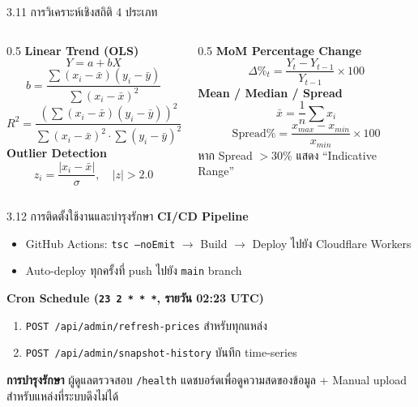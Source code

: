 \documentclass[aspectratio=169,11pt]{beamer}
\begin{document}
\begin{frame}{3.11 การวิเคราะห์เชิงสถิติ 4 ประเภท}
  \footnotesize
  \begin{columns}[T,onlytextwidth]
    \begin{column}{0.5\textwidth}
      \textbf{Linear Trend (OLS)}
      \[
        Y = a + bX
      \]
      \[
        b = \frac{\sum (x_i - \bar{x})(y_i - \bar{y})}{\sum (x_i - \bar{x})^2}
      \]
      \[
        R^2 = \frac{(\sum(x_i-\bar{x})(y_i-\bar{y}))^2}
                   {\sum(x_i-\bar{x})^2 \cdot \sum(y_i-\bar{y})^2}
      \]
      \vspace{0.3em}
      \textbf{Outlier Detection}
      \[
        z_i = \frac{|x_i - \bar{x}|}{\sigma}, \quad |z| > 2.0
      \]
    \end{column}
    \begin{column}{0.5\textwidth}
      \textbf{MoM Percentage Change}
      \[
        \Delta\%_t = \frac{Y_t - Y_{t-1}}{Y_{t-1}} \times 100
      \]
      \vspace{0.3em}
      \textbf{Mean / Median / Spread}
      \[
        \bar{x} = \frac{1}{n}\sum x_i
      \]
      \[
        \text{Spread\%} = \frac{x_{max} - x_{min}}{x_{min}} \times 100
      \]
      หาก Spread $>$30\% แสดง ``Indicative Range''
    \end{column}
  \end{columns}
\end{frame}

\begin{frame}{3.12 การติดตั้งใช้งานและบำรุงรักษา}
  \textbf{CI/CD Pipeline}
  \begin{itemize}
    \item GitHub Actions: \texttt{tsc --noEmit} $\to$ Build $\to$ Deploy
          ไปยัง Cloudflare Workers
    \item Auto-deploy ทุกครั้งที่ push ไปยัง \texttt{main} branch
  \end{itemize}
  \vspace{0.3em}
  \textbf{Cron Schedule (\texttt{23 2 * * *}, รายวัน 02:23 UTC)}
  \begin{enumerate}
    \item \texttt{POST /api/admin/refresh-prices} สำหรับทุกแหล่ง
    \item \texttt{POST /api/admin/snapshot-history} บันทึก time-series
  \end{enumerate}
  \vspace{0.3em}
  \begin{block}{\textbf{การบำรุงรักษา}}
    ผู้ดูแลตรวจสอบ \texttt{/health} แดชบอร์ดเพื่อดูความสดของข้อมูล
    + Manual upload สำหรับแหล่งที่ระบบดึงไม่ได้
  \end{block}
\end{frame}
\end{document}
